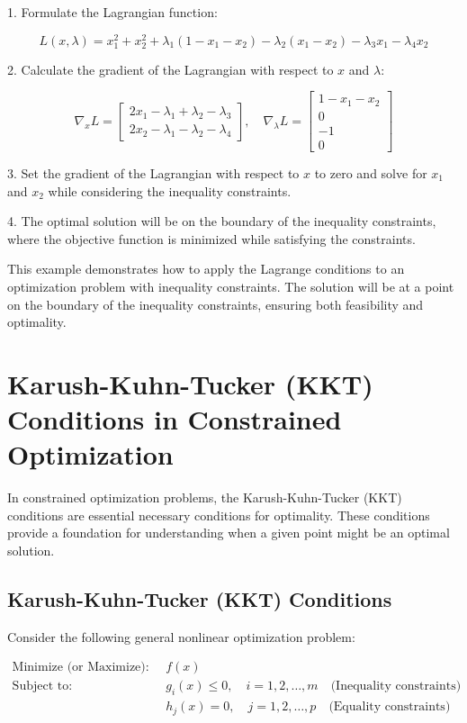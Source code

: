\documentclass[a4paper]{article}
\begin{document}
1. Formulate the Lagrangian function:

\[
L(x, \lambda) = x_1^2 + x_2^2 + \lambda_1(1 - x_1 - x_2) - \lambda_2(x_1 - x_2) - \lambda_3x_1 - \lambda_4x_2
\]

2. Calculate the gradient of the Lagrangian with respect to \(x\) and \(\lambda\):

\[
\nabla_x L = \begin{bmatrix} 2x_1 - \lambda_1 + \lambda_2 - \lambda_3 \\ 2x_2 - \lambda_1 - \lambda_2 - \lambda_4 \end{bmatrix}, \quad \nabla_\lambda L = \begin{bmatrix} 1 - x_1 - x_2 \\ 0 \\ -1 \\ 0 \end{bmatrix}
\]

3. Set the gradient of the Lagrangian with respect to \(x\) to zero and solve for \(x_1\) and \(x_2\) while considering the inequality constraints.

4. The optimal solution will be on the boundary of the inequality constraints, where the objective function is minimized while satisfying the constraints.

This example demonstrates how to apply the Lagrange conditions to an optimization problem with inequality constraints. The solution will be at a point on the boundary of the inequality constraints, ensuring both feasibility and optimality.

\section{Karush-Kuhn-Tucker (KKT) Conditions in Constrained Optimization}

In constrained optimization problems, the Karush-Kuhn-Tucker (KKT) conditions are essential necessary conditions for optimality. These conditions provide a foundation for understanding when a given point might be an optimal solution.

\subsection{Karush-Kuhn-Tucker (KKT) Conditions}

Consider the following general nonlinear optimization problem:

\begin{align*}
\text{Minimize (or Maximize):} \quad & f(x) \\
\text{Subject to:} \quad & g_i(x) \leq 0, \quad i = 1, 2, \ldots, m \quad \text{(Inequality constraints)} \\
& h_j(x) = 0, \quad j = 1, 2, \ldots, p \quad \text{(Equality constraints)}
\end{align*}
\end{document}

